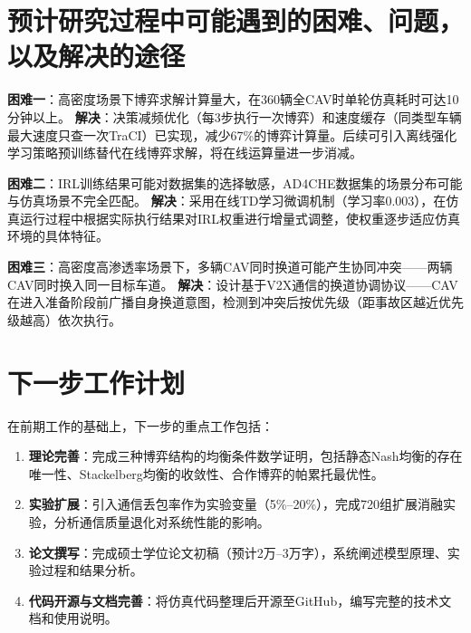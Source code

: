 \section{预计研究过程中可能遇到的困难、问题，以及解决的途径}
\textbf{困难一}：高密度场景下博弈求解计算量大，在360辆全CAV时单轮仿真耗时可达10分钟以上。
\textbf{解决}：决策减频优化（每3步执行一次博弈）和速度缓存（同类型车辆最大速度只查一次TraCI）已实现，减少67\%的博弈计算量。后续可引入离线强化学习策略预训练替代在线博弈求解，将在线运算量进一步消减。

\textbf{困难二}：IRL训练结果可能对数据集的选择敏感，AD4CHE数据集的场景分布可能与仿真场景不完全匹配。
\textbf{解决}：采用在线TD学习微调机制（学习率0.003），在仿真运行过程中根据实际执行结果对IRL权重进行增量式调整，使权重逐步适应仿真环境的具体特征。

\textbf{困难三}：高密度高渗透率场景下，多辆CAV同时换道可能产生协同冲突——两辆CAV同时换入同一目标车道。
\textbf{解决}：设计基于V2X通信的换道协调协议——CAV在进入准备阶段前广播自身换道意图，检测到冲突后按优先级（距事故区越近优先级越高）依次执行。

\section{下一步工作计划}
在前期工作的基础上，下一步的重点工作包括：

\begin{enumerate}
    \item \textbf{理论完善}：完成三种博弈结构的均衡条件数学证明，包括静态Nash均衡的存在唯一性、Stackelberg均衡的收敛性、合作博弈的帕累托最优性。
    \item \textbf{实验扩展}：引入通信丢包率作为实验变量（5\%--20\%），完成720组扩展消融实验，分析通信质量退化对系统性能的影响。
    \item \textbf{论文撰写}：完成硕士学位论文初稿（预计2万--3万字），系统阐述模型原理、实验过程和结果分析。
    \item \textbf{代码开源与文档完善}：将仿真代码整理后开源至GitHub，编写完整的技术文档和使用说明。
\end{enumerate}
